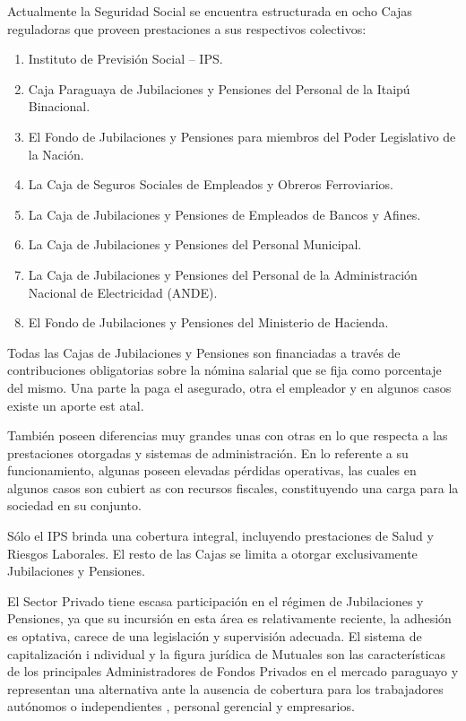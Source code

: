 Actualmente la Seguridad Social se encuentra estructurada en ocho Cajas
reguladoras que proveen prestaciones a sus respectivos colectivos:

\begin {enumerate}

\item Instituto de Previsión Social – IPS. 

\item Caja Paraguaya de Jubilaciones y Pensiones del Personal de la Itaipú Binacional.

\item El Fondo de Jubilaciones y Pensiones para miembros del Poder Legislativo de la Nación. 

\item La Caja de Seguros Sociales de Empleados y Obreros Ferroviarios. 

\item La Caja de Jubilaciones y Pensiones de Empleados de Bancos y Afines.

\item La Caja de Jubilaciones y Pensiones del Personal Municipal.

\item La Caja de Jubilaciones y Pensiones del Personal de la Administración Nacional de Electricidad (ANDE). 

\item El Fondo de Jubilaciones y Pensiones del Ministerio de Hacienda. 

\end{enumerate}

Todas las Cajas de Jubilaciones y Pensiones son financiadas a través de
contribuciones obligatorias sobre la nómina salarial que se fija como
porcentaje del mismo. Una parte la paga el asegurado, otra el empleador
y en algunos casos existe un aporte est atal.

También poseen diferencias muy grandes unas con otras en lo que respecta
a las prestaciones otorgadas y sistemas de administración. En lo
referente a su funcionamiento, algunas poseen elevadas pérdidas
operativas, las cuales en algunos casos son cubiert as con recursos
fiscales, constituyendo una carga para la sociedad en su conjunto.

Sólo el IPS brinda una cobertura integral, incluyendo prestaciones de
Salud y Riesgos Laborales. El resto de las Cajas se limita a otorgar
exclusivamente Jubilaciones y Pensiones.

El Sector Privado tiene escasa participación en el régimen de
Jubilaciones y Pensiones, ya que su incursión en esta área es
relativamente reciente, la adhesión es optativa, carece de una
legislación y supervisión adecuada. El sistema de capitalización i
ndividual y la figura jurídica de Mutuales son las características de
los principales Administradores de Fondos Privados en el mercado
paraguayo y representan una alternativa ante la ausencia de cobertura
para los trabajadores autónomos o independientes , personal gerencial y
empresarios.

